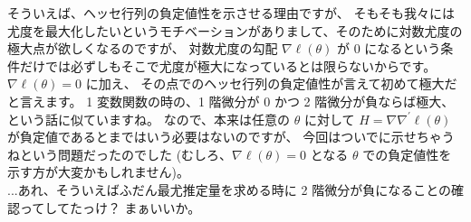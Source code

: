 \documentclass[./main.tex]{subfiles}
\begin{document}
\begin{enumerate}
\begin{enumerate}
            そういえば、ヘッセ行列の負定値性を示させる理由ですが、
            そもそも我々には尤度を最大化したいというモチベーションがありまして、そのために対数尤度の極大点が欲しくなるのですが、
            対数尤度の勾配 $\nabla \ell(\theta)$ が $0$ になるという条件だけでは必ずしもそこで尤度が極大になっているとは限らないからです。
            $\nabla \ell (\theta) = 0$ に加え、
            その点でのヘッセ行列の負定値性が言えて初めて極大だと言えます。
            1 変数関数の時の、1 階微分が $0$ かつ 2 階微分が負ならば極大、という話に似ていますね。
            なので、本来は任意の $\theta$ に対して $H = \nabla\nabla^\prime \ell (\theta)$ が負定値であるとまではいう必要はないのですが、
            今回はついでに示せちゃうねという問題だったのでした (むしろ、$\nabla \ell (\theta) = 0$ となる $\theta$ での負定値性を示す方が大変かもしれません)。
            \\
            ...あれ、そういえばふだん最尤推定量を求める時に 2 階微分が負になることの確認ってしてたっけ？
            まぁいいか。
            

        \end{enumerate}
    \end{enumerate}
\end{document}
